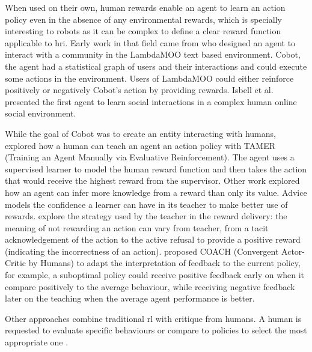 When used on their own, human rewards enable an agent to learn an action policy even in the absence of any environmental rewards, which is specially interesting to robots as it can be complex to define a clear reward function applicable to \gls{hri}. Early work in that field came from \cite{isbell2006cobot} who designed an agent to interact with a community in the LambdaMOO text based environment. Cobot, the agent had a statistical graph of users and their interactions and could execute some actions in the environment. Users of LambdaMOO could either reinforce positively or negatively Cobot's action by providing rewards. Isbell et al. presented the first agent to learn social interactions in a complex human online social environment. 

While the goal of Cobot was to create an entity interacting with humans, \cite{knox2009interactively} explored how a human can teach an agent an action policy with TAMER (Training an Agent Manually via Evaluative Reinforcement). The agent uses a supervised learner to model the human reward function and then takes the action that would receive the highest reward from the supervisor. Other work explored how an agent can infer more knowledge from a reward than only its value. Advice \citep{griffith2013policy} models the confidence a learner can have in its teacher to make better use of rewards. \citep{loftin2016learning} explore the strategy used by the teacher in the reward delivery: the meaning of not rewarding an action can vary from teacher, from a tacit acknowledgement of the action to the active refusal to provide a positive reward (indicating the incorrectness of an action). \cite{macglashan2017interactive} proposed COACH (Convergent Actor-Critic by Humans) to adapt the interpretation of feedback to the current policy, for example, a suboptimal policy could receive positive feedback early on when it compare positively to the average behaviour, while receiving negative feedback later on the teaching when the average agent performance is better.

Other approaches combine traditional \gls{rl} with critique from humans. A human is requested to evaluate specific behaviours \citep{judah2010reinforcement} or compare to policies to select the most appropriate one \citep{christiano2017deep}.


